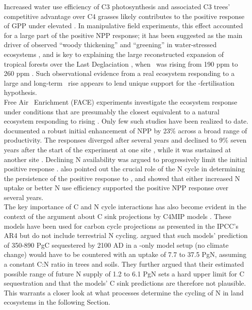 Increased water use efficiency of C3 photosynthesis and associated C3 trees' competitive advantage over C4 grasses likely contributes to the positive response of GPP under elevated \coo . In manipulative field experiments, this effect accounted for a large part of the positive NPP response; it has been suggested as the main driver of observed ``woody thickening'' and ``greening'' in water-stressed ecosystems \citep{donohue13, wigley10}, and is key to explaining the large reconstructed expansion of tropical forests over the Last Deglaciation \citep{bragg13}, when \coo\ was rising from 190 ppm to 260 ppm \citep{monnin01}. Such observational evidence from a real ecosystem responding to a large and long-term \coo\ rise appears to lend unique support for the \coo -fertilisation hypothesis.\\

Free Air \coo\ Enrichment (FACE) experiments investigate the ecosystem response under conditions that are presumably the closest equivalent to a natural ecosystem responding to rising \coo . Only few such studies have been realized to date. \citet{norby05} documented a robust initial enhancement of NPP by 23\% across a broad range of productivity. The responses diverged after several years and declined to 9\% seven years after the start of the experiment at one site \citep{norby10}, while it was sustained at another site \citep{drake11}. Declining N availability was argued to progressively limit the initial positive response \citep{norby10}. \citet{finzi07} also pointed out the crucial role of the N cycle in determining the persistence of the positive response to \coo , and showed that either increased N uptake or better N use efficiency supported the positive NPP response over several years.\\

The key importance of C and N cycle interactions has also become evident in the context of the argument about C sink projections by C4MIP models \citep{friedlingstein06}. These models have been used for carbon cycle projections as presented in the IPCC's AR4 \citep{denman07ipcc} but do not include terrestrial N cycling. \citet{hungate03} argued that such models' prediction of 350-890 PgC sequestered by 2100 AD in a  \coo -only model setup (no climate change) would have to be countered with an uptake of 7.7 to 37.5 PgN, assuming a constant C:N ratio in trees and soils. They further argued that their estimated possible range of future N supply of 1.2 to 6.1 PgN sets a hard upper limit for C sequestration and that the models' C sink predictions are therefore not plausible. This warrants a closer look at what processes determine the cycling of N in land ecosystems in the following Section. 


